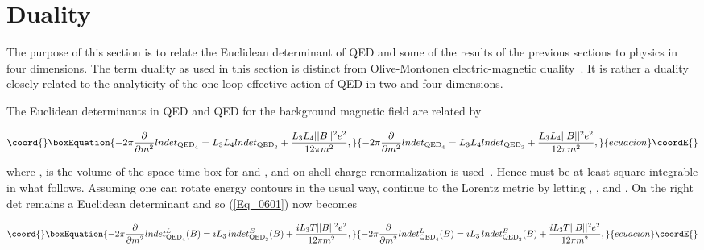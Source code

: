 \documentclass[a4paper,twocolumn,showpacs,preprintnumbers,amsmath,amssymb]{revtex4}
\providecommand{\pdo}[1]{\ensuremath{\frac{\partial }
        {\partial #1 }}}
\begin{document}

\section{\label{Sec_SecVI}
Duality}

The purpose of this section is to relate the Euclidean determinant of
QED\coordHE{} and some of the results of the previous sections to physics in
four dimensions. The term duality as used in this section is distinct
from Olive-Montonen electric-magnetic duality~\cite{Montonen77}. It is
rather a duality closely related to the analyticity of the one-loop
effective action of QED in two and four dimensions.

The Euclidean determinants in QED\coordHE{} and QED\coordHE{} for the background
magnetic field \coordHE{} are related by

\begin{widetext}
\begin{equation}\coord{}\boxEquation{
\label{Eq_0601}
-2\pi \pdo{m^2} lndet_{\text{QED}_4}
  = L_3 L_4 lndet_{\text{QED}_2}
    + \frac{L_3 L_4 ||B||^2 e^2}{12\pi m^2},
}{
-2\pi \pdo{m^2} lndet_{\text{QED}_4}
  = L_3 L_4 lndet_{\text{QED}_2}
    + \frac{L_3 L_4 ||B||^2 e^2}{12\pi m^2},
}{ecuacion}\coordE{}\end{equation}
\end{widetext}

\noindent
where \coordHE{}, \coordHE{} is the
volume of the space-time box for \coordHE{} and \coordHE{}, and on-shell charge
renormalization is used~\cite{Fry92}. Hence \coordHE{} must be at least
square-integrable in what follows.  Assuming one can rotate energy
contours in the usual way, continue \coordHE{} to the
Lorentz metric by letting \coordHE{},
\coordHE{}, \coordHE{} and \coordHE{}.
On the right det\coordHE{} remains a Euclidean determinant and
so (\ref{Eq_0601}) now becomes

\begin{widetext}
\begin{equation}\coord{}\boxEquation{
\label{Eq_0602}
-2 \pi \pdo{m^2} lndet^L_{\text{QED}_4}(B)
  = i L_3 \, lndet^E_{\text{QED}_2}(B)
    + \frac{i L_3 T ||B||^2 e^2}{12 \pi m^2},
}{
-2 \pi \pdo{m^2} lndet^L_{\text{QED}_4}(B)
  = i L_3 \, lndet^E_{\text{QED}_2}(B)
    + \frac{i L_3 T ||B||^2 e^2}{12 \pi m^2},
}{ecuacion}\coordE{}\end{equation}
\end{widetext}
\end{document}

